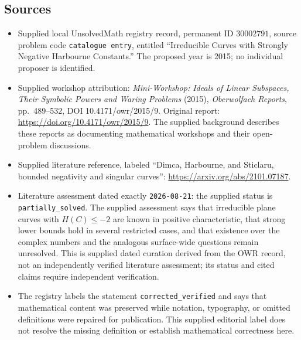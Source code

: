 \documentclass[11pt]{article}
\begin{document}
\subsection{Sources}
\begin{itemize}
\item Supplied local UnsolvedMath registry record, permanent ID \(30002791\), source problem code \texttt{catalogue entry}, entitled ``Irreducible Curves with Strongly Negative Harbourne Constants.'' The proposed year is 2015; no individual proposer is identified.
\item Supplied workshop attribution: \emph{Mini-Workshop: Ideals of Linear Subspaces, Their Symbolic Powers and Waring Problems} (2015), \emph{Oberwolfach Reports}, pp.~489--532, DOI 10.4171/owr/2015/9. Original report: \url{https://doi.org/10.4171/owr/2015/9}. The supplied background describes these reports as documenting mathematical workshops and their open-problem discussions.
\item Supplied literature reference, labeled ``Dimca, Harbourne, and Sticlaru, bounded negativity and singular curves'': \url{https://arxiv.org/abs/2101.07187}.
\item Literature assessment dated exactly \texttt{2026-08-21}: the supplied status is \texttt{partially\_solved}. The supplied assessment says that irreducible plane curves with \(H(C)\leq -2\) are known in positive characteristic, that strong lower bounds hold in several restricted cases, and that existence over the complex numbers and the analogous surface-wide questions remain unresolved. This is supplied dated curation derived from the OWR record, not an independently verified literature assessment; its status and cited claims require independent verification.
\item The registry labels the statement \texttt{corrected\_verified} and says that mathematical content was preserved while notation, typography, or omitted definitions were repaired for publication. This supplied editorial label does not resolve the missing definition or establish mathematical correctness here.
\end{itemize}
\end{document}
